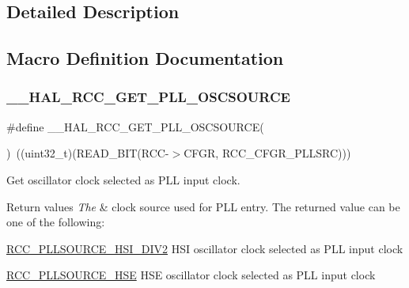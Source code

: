 \subsection{Detailed Description}


\subsection{Macro Definition Documentation}
\mbox{\label{group___r_c_c___p_l_l___configuration_ga3ea1390f8124e2b3b8d53e95541d6e53}} 
\subsubsection{\texorpdfstring{\+\_\+\+\_\+\+H\+A\+L\+\_\+\+R\+C\+C\+\_\+\+G\+E\+T\+\_\+\+P\+L\+L\+\_\+\+O\+S\+C\+S\+O\+U\+R\+CE}{\_\_HAL\_RCC\_GET\_PLL\_OSCSOURCE}}
{\footnotesize\ttfamily \#define \+\_\+\+\_\+\+H\+A\+L\+\_\+\+R\+C\+C\+\_\+\+G\+E\+T\+\_\+\+P\+L\+L\+\_\+\+O\+S\+C\+S\+O\+U\+R\+CE(\begin{DoxyParamCaption}{ }\end{DoxyParamCaption})~((uint32\+\_\+t)(R\+E\+A\+D\+\_\+\+B\+IT(R\+CC-\/$>$C\+F\+GR, R\+C\+C\+\_\+\+C\+F\+G\+R\+\_\+\+P\+L\+L\+S\+RC)))}



Get oscillator clock selected as P\+LL input clock. 


\begin{DoxyRetVals}{Return values}
{\em The} & clock source used for P\+LL entry. The returned value can be one of the following\+: \begin{DoxyItemize}
\item \hyperlink{group___r_c_c___p_l_l___clock___source_ga09fff12a4e92f4da5980321b7f99b632}{R\+C\+C\+\_\+\+P\+L\+L\+S\+O\+U\+R\+C\+E\+\_\+\+H\+S\+I\+\_\+\+D\+I\+V2} H\+SI oscillator clock selected as P\+LL input clock \item \hyperlink{group___r_c_c___p_l_l___clock___source_ga197cea7fe5c2db26fe7fcdb0f99dd4d7}{R\+C\+C\+\_\+\+P\+L\+L\+S\+O\+U\+R\+C\+E\+\_\+\+H\+SE} H\+SE oscillator clock selected as P\+LL input clock \end{DoxyItemize}
\\
\hline
\end{DoxyRetVals}


